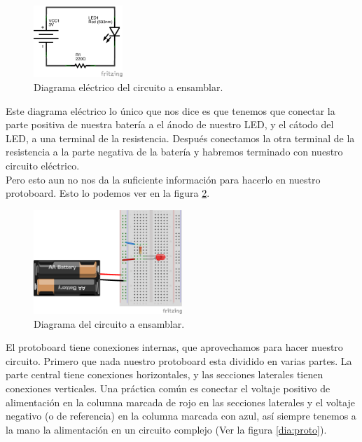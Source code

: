     \begin{figure}[h]
    	\begin{center}
    		\includegraphics[width=0.3\textwidth]{images/LED-bateria-diagrama.png}
    		\caption{Diagrama eléctrico del circuito a ensamblar.}
    		\label{dia:elecir}
    	\end{center}
    \end{figure}

    Este diagrama eléctrico lo único que nos dice es que tenemos que conectar la parte positiva de nuestra batería a el ánodo de nuestro LED, y el cátodo del LED, a una terminal de la resistencia. Después conectamos la otra terminal de la resistencia a la parte negativa de la batería y habremos terminado con nuestro circuito eléctrico. \\

    Pero esto aun no nos da la suficiente información para hacerlo en nuestro protoboard. Esto lo podemos ver en la figura \ref{dia:cir}. \\

    \begin{figure}[h]
    	\begin{center}
    		\includegraphics[width=0.5\textwidth]{images/LED-bateria.png}
    		\caption{Diagrama del circuito a ensamblar.}
    		\label{dia:cir}
    	\end{center}
    \end{figure}

    El protoboard tiene conexiones internas, que aprovechamos para hacer nuestro circuito. Primero que nada nuestro protoboard esta dividido en varias partes. La parte central tiene conexiones horizontales, y las secciones laterales tienen conexiones verticales. Una práctica común es conectar el voltaje positivo de alimentación en la columna marcada de rojo en las secciones laterales y el voltaje negativo (o de referencia) en la columna marcada con azul, así siempre tenemos a la mano la alimentación en un circuito complejo (Ver la figura \ref{dia:proto}). \\

